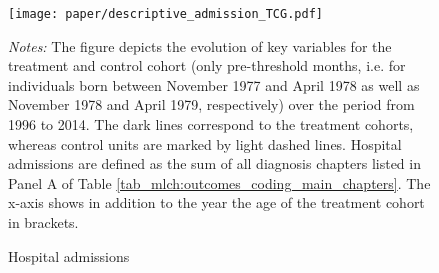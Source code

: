 

\newpage
\vspace*{\fill}
\begin{figure}[H]\centering
	\caption{Hospital admissions}\label{fig_mlch: descriptive_hospital_admission}
	\texttt{[image: paper/descriptive\_admission\_TCG.pdf]}
	\begin{minipage}{\linewidth}
		\scriptsize{\emph{Notes:} The figure depicts the evolution of key variables for the treatment and control cohort (only pre-threshold months, i.e. for individuals born between November 1977 and April 1978 as well as November 1978 and April 1979, respectively) over the period from 1996 to 2014. The dark lines correspond to the treatment cohorts, whereas control units are marked by light dashed lines. Hospital admissions are defined as the sum of all diagnosis chapters listed in Panel A of Table \ref{tab_mlch:outcomes_coding_main_chapters}. The x-axis shows in addition to the year the age of the treatment cohort in brackets.} 
	\end{minipage}
\end{figure}
\vspace*{\fill}\clearpage









